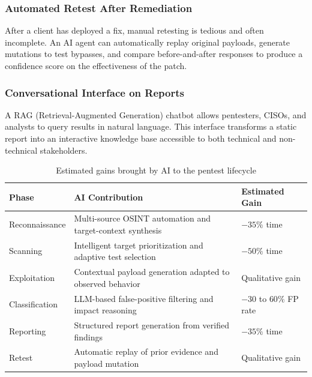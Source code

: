 \documentclass[12pt,a4paper]{report}
\begin{document}
\subsubsection{Automated Retest After Remediation}

After a client has deployed a fix, manual retesting is tedious and often incomplete.
An AI agent can automatically replay original payloads, generate mutations to test
bypasses, and compare before-and-after responses to produce a confidence score on
the effectiveness of the patch.

\subsubsection{Conversational Interface on Reports}

A RAG (Retrieval-Augmented Generation) chatbot allows pentesters, CISOs, and
analysts to query results in natural language. This interface transforms a static
report into an interactive knowledge base accessible to both technical and
non-technical stakeholders.

\begin{table}[H]
    \centering
    \renewcommand{\arraystretch}{1.35}
    \begin{tabular}{|p{}|p{}|p{}|}
        \hline
        \textbf{Phase} & \textbf{AI Contribution} & \textbf{Estimated Gain} \\
        \hline
        Reconnaissance & Multi-source OSINT automation and
        target-context synthesis~\cite{bishopfoxAI} &
        $-35\%$ time \\
        \hline
        Scanning & Intelligent target prioritization and
        adaptive test selection~\cite{brightdefense2026} &
        $-50\%$ time \\
        \hline
        Exploitation & Contextual payload generation adapted
        to observed behavior~\cite{autosecagent2026} &
        Qualitative gain \\
        \hline
        Classification & LLM-based false-positive filtering
        and impact reasoning~\cite{threatexploitFP} &
        $-30$ to $60\%$ FP rate \\
        \hline
        Reporting & Structured report generation from verified
        findings~\cite{bishopfoxAI} &
        $-35\%$ time \\
        \hline
        Retest & Automatic replay of prior evidence and
        payload mutation~\cite{autosecagent2026} &
        Qualitative gain \\
        \hline
    \end{tabular}
    \caption{Estimated gains brought by AI to the pentest lifecycle}
    \label{tab:ai_gains}
\end{table}
\end{document}
